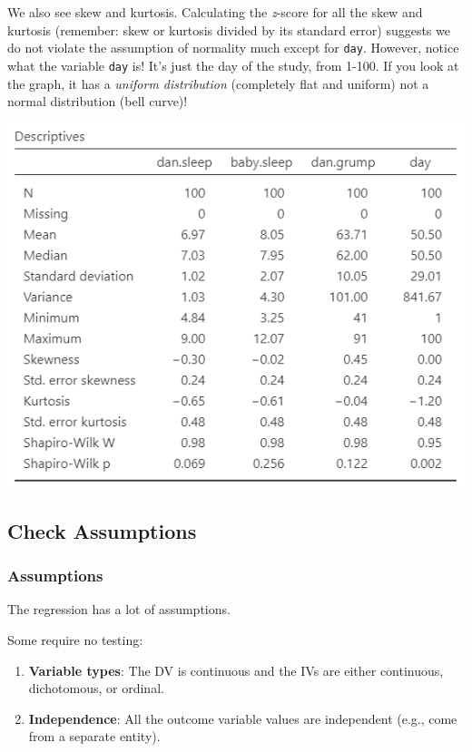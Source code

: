\documentclass[
]{book}
\begin{document}
We also see skew and kurtosis. Calculating the \emph{z}-score for all the skew and kurtosis (remember: skew or kurtosis divided by its standard error) suggests we do not violate the assumption of normality much except for \texttt{day}. However, notice what the variable \texttt{day} is! It's just the day of the study, from 1-100. If you look at the graph, it has a \emph{uniform distribution} (completely flat and uniform) not a normal distribution (bell curve)!

\includegraphics{images/08-correlation/correlation-descriptives.png}

\hypertarget{check-assumptions-7}{%
\subsection{Check Assumptions}\label{check-assumptions-7}}

\hypertarget{assumptions-7}{%
\subsubsection{Assumptions}\label{assumptions-7}}

The regression has a lot of assumptions.

Some require no testing:

\begin{enumerate}
\def\labelenumi{\arabic{enumi}.}
\item
  \textbf{Variable types}: The DV is continuous and the IVs are either continuous, dichotomous, or ordinal.
\item
  \textbf{Independence}: All the outcome variable values are independent (e.g., come from a separate entity).
\end{enumerate}
\end{document}
